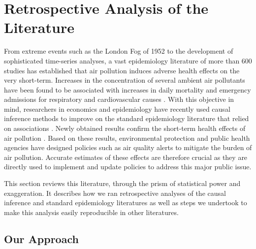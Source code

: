 \documentclass[12pt]{article}
\begin{document}



\section{Retrospective Analysis of the Literature}\label{section_lit_review}

    From extreme events such as the London Fog of 1952 to the development of sophisticated time-series analyses, a vast epidemiology literature of more than 600 studies has established that air pollution induces adverse health effects on the very short-term. Increases in the concentration of several ambient air pollutants have been found to be associated with increases in daily mortality and emergency admissions for respiratory and cardiovascular causes \citep{schwartz1994people, samet2000national, le2002short, bell2004time, liu_ambient_2019}. With this objective in mind, researchers in economics and epidemiology have recently used causal inference methods to improve on the standard epidemiology literature that relied on associations \citep{dominici_best_2017, bind_causal_2019}. Newly obtained results confirm the short-term health effects of air pollution \citep{schwartz_estimating_2015, schwartz_national_2018, deryugina_mortality_2019}. Based on these results, environmental protection and public health agencies have designed policies such as air quality alerts to mitigate the burden of air pollution. Accurate estimates of these effects are therefore crucial as they are directly used to implement and update policies to address this major public issue.

    This section reviews this literature, through the prism of statistical power and exaggeration. It describes how we ran retrospective analyses of the causal inference and standard epidemiology literatures as well as steps we undertook to make this analysis easily reproducible in other literatures.
    
    \subsection{Our Approach}
    
\end{document}
